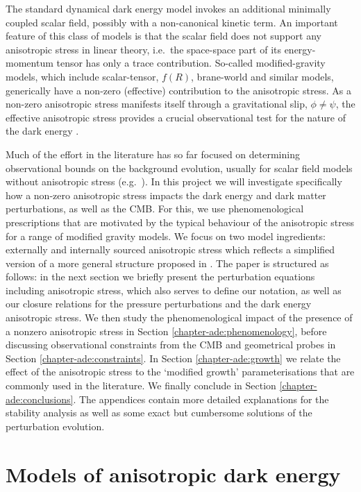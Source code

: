 The standard dynamical dark energy model invokes an additional minimally coupled scalar 
field, possibly with a non-canonical kinetic term. An important feature of this 
class of models is that the scalar field does not support any anisotropic stress 
in linear theory, i.e.\ the space-space part of its energy-momentum tensor has only a 
trace contribution. So-called modified-gravity models, which include 
scalar-tensor, $f(R)$, brane-world and similar models, generically have a non-zero 
(effective) contribution to the anisotropic stress. As a non-zero anisotropic 
stress manifests itself through a gravitational slip, $\phi\neq\psi$, the 
effective anisotropic stress provides a crucial observational test for the nature 
of the dark energy \cite{Kunz:2006ca, Saltas:2010tt}.

Much of the effort in the literature has so far focused on determining 
observational bounds on the background evolution, usually for scalar field models 
without anisotropic stress (e.g.\ \cite{Copeland:2006wr, Frieman:2008sn,Sapone:2010iz,Amendola:2012ys}). 
In this project we will investigate specifically how a non-zero 
anisotropic stress impacts the dark energy and dark matter perturbations, as well 
as the CMB. For this, we use phenomenological prescriptions that are 
motivated by the typical behaviour of the anisotropic stress for a range of 
modified gravity models. We focus on two model ingredients: externally and 
internally sourced anisotropic stress which reflects a simplified version of a 
more general structure proposed in \cite{Sawicki:2012re}. The paper is structured 
as follows: in the next section we briefly present the perturbation equations 
including anisotropic stress, which also serves to define our notation, as well as 
our closure relations for the pressure perturbations and the dark energy 
anisotropic stress. We then study the phenomenological impact of the presence of a 
nonzero anisotropic stress in Section \ref{chapter-ade:phenomenology}, before discussing observational 
constraints from the CMB and geometrical probes in Section \ref{chapter-ade:constraints}. In Section \ref{chapter-ade:growth}  we 
relate the effect of the anisotropic stress to the `modified growth' 
parameterisations that are commonly used in the literature.  We finally conclude 
in Section \ref{chapter-ade:conclusions}. The appendices contain more detailed explanations for the stability 
analysis as well as some exact but cumbersome solutions of the perturbation 
evolution.

\section{Models of anisotropic dark energy}
\label{chapter-ade:models}

